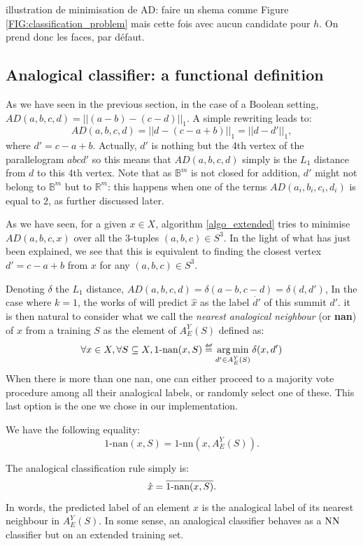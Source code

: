 {\color{red} illustration de minimisation de AD: faire un shema comme Figure
\ref{FIG:classification_problem} mais cette fois avec aucun candidate pour
$h$. On prend donc les faces, par défaut}.

\subsection{Analogical classifier: a functional definition}\label{FUNCTIONAL_DEF}

As we have seen in the previous section, in the case of a Boolean setting,
$AD(a,b,c,d)= ||(a-b)-(c-d)||_1$.  A simple rewriting leads to:
$$AD(a,b,c,d)=||d - (c-a+b)||_1=||d - d'||_1,$$
where $d'=c-a+b$. Actually, $d'$ is nothing but the 4th vertex of the
parallelogram $abcd'$ so this means that $AD(a,b,c,d)$ simply is the $L_1$ distance
 from $d$ to this 4th vertex. Note that as $\mathbb{B}^m$ is not closed for
addition, $d'$ might not belong to $\mathbb{B}^m$ but to $\mathbb{R}^m$: this
happens when one of the terms $AD(a_i, b_i, c_i, d_i)$ is equal to $2$, as
further discussed later.

As we have seen, for a given $x \in X$, algorithm \ref{algo_extended} tries to
minimise $AD(a,b,c,x)$ over all the 3-tuples $(a,b,c) \in S^3$. In the
light of what has just been explained, we see that this is equivalent to
finding the closest vertex $d'=c-a+b$  from $x$ for any $(a, b, c) \in S^3$.


Denoting $\delta$ the $L_1$ distance, $AD(a,b,c,d) =\delta(a-b,c-d) =
\delta(d,d')$,
In the case where $k=1$, the
works of \cite{BayMicDelIJCAI07} will predict $\hat{x}$ as the label $\dot{d'}$ of
this summit $d'$. 
it is then natural to consider what we call the \textit{nearest analogical
neighbour} (or \textbf{nan}) of $x$ from a training $S$ as the element of
$A_E^Y(S)$ defined as:
$$\forall x \in X, \forall S \subseteq X, 1\mbox{-nan}(x,S)\eqdef \argmin_{d'
\in A_E^Y(S)} \delta(x,d')$$
When there is more than one nan, one can either proceed to a majority vote
procedure among all their analogical labels, or randomly select one of these.
This last option is the one we chose in our implementation.
\begin{property} \label{propnn}We have the following equality:
$$1\mbox{-nan}(x,S)= 1\mbox{-nn}(x,A_E^Y(S)).$$
\end{property}
The analogical classification rule simply is:
$$\hat{x} = \overline{1\mbox{-nan}(x,S)}.$$
In words, the predicted label of an element $x$ is the analogical label of its
nearest neighbour in $A_E^Y(S)$.
In some sense, an analogical classifier behaves
as a $\mbox{NN}$ classifier but on an extended training set.

